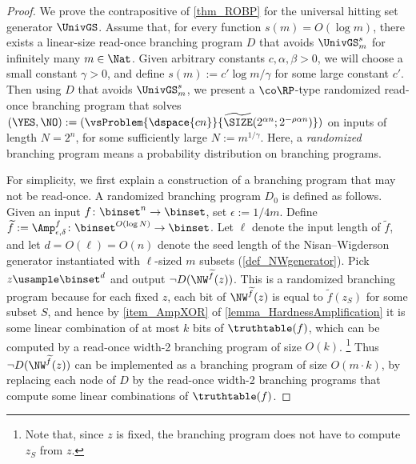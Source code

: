 \documentclass[11pt]{article}
\numberwithin{equation}{section}
\theoremstyle{definition}
\theoremstyle{plain}
\begin{document}
\begin{proof}
  We prove the contrapositive of \cref{thm_ROBP} for the universal hitting set generator $\UnivGS$.
  Assume that,
  for every function $s(m) = O(\log m)$,
  there exists a linear-size read-once branching program $D$ that avoids $\UnivGS_m^s$
  for infinitely many $m \in \Nat$.
  Given arbitrary constants $c, \alpha, \beta > 0$,
  we will choose a small constant $\gamma > 0$,
  and define $s(m) := c' \log m / \gamma$ for some large constant $c'$.
  Then using $D$ that avoids $\UnivGS_m^s$,
  we present a $\co\RP$-type randomized read-once branching program that solves
  $(\YES, \NO) := (\vsProblem{\dspace{cn}} { \widetilde{\SIZE}(2^{\alpha n}; 2^{- \rho \alpha n }) })$
  on inputs of length $N = 2^n$,
  for some sufficiently large $N := m^{1 / \gamma}$.
  Here, a \emph{randomized} branching program means a probability distribution on branching programs.

  For simplicity, we first explain a construction of a branching program that may not be read-once.
  A randomized branching program $D_0$ is defined as follows.
  Given an input $f \colon \binset^n \to \binset$,
  set $\epsilon := 1/4m$.
  Define ${\widetilde{f}} := \Amp_{\epsilon, \delta}^{f} \colon \binset^{O(\log N)} \to \binset$.
  Let $\ell$ denote the input length of ${\widetilde{f}}$,
  and let $d = O(\ell) = O(n)$ denote the seed length of the Nisan--Wigderson generator instantiated with $\ell$-sized $m$ subsets (\cref{def_NWgenerator}).
  Pick $z \usample \binset^d$
  and output $\neg D(\NW^{{\widetilde{f}}}(z))$.
  This is a randomized branching program because for each fixed $z$,
  each bit of $\NW^{\widetilde{f}}(z)$ is equal to ${\widetilde{f}}(z_{S})$ for some subset $S$,
  and hence by \cref{item_AmpXOR} of \cref{lemma_HardnessAmplification}
  it is some linear combination of at most $k$ bits of $\truthtable(f)$, which can be computed by a read-once width-2 branching program of size $O(k)$.%
  \footnote{Note that, since $z$ is fixed, the branching program does not have to compute $z_S$ from $z$.}
  Thus $\neg D(\NW^{{\widetilde{f}}}(z))$ can be implemented as a branching program of size $O(m \cdot k)$, by replacing each node of $D$ by the read-once width-2 branching programs that compute some linear combinations of $\truthtable(f)$.



\end{proof}
\end{document}
